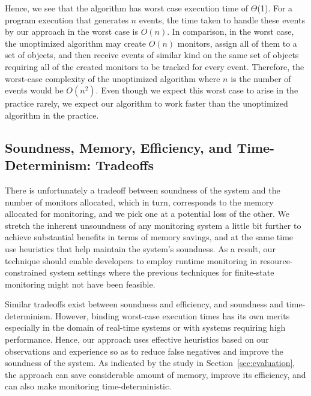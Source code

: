 Hence, we see that the algorithm has worst case execution time of
$\Theta$(1). For a program execution that  generates $n$ events, the time taken to handle 
these events by our approach in the worst case is $O(n)$. In comparison, in the worst case,
the unoptimized algorithm may create $O(n)$ monitors, assign all of them to a set of objects,
 and then receive events of similar kind on the same set of objects
 requiring all of the created monitors to be tracked for every event. Therefore, the worst-case complexity of the
 unoptimized algorithm where $n$ is the number of events would be $O(n^2)$. Even though we expect this worst case to arise 
 in the practice rarely, we expect our algorithm to work faster than the unoptimized algorithm in the practice.
 
\subsection{Soundness, Memory, Efficiency, and Time-Determinism: Tradeoffs}
\label{subsec:tradeoff}

There is unfortunately a tradeoff between soundness of the system and the
number of monitors allocated, which in turn, corresponds to the memory allocated
for monitoring, and we pick one at a potential loss of the other.
We stretch the inherent unsoundness of any monitoring system a little bit further to achieve substantial benefits in 
terms of memory savings, and at the same time use heuristics that help maintain
the system's soundness.  As a result, our technique should enable developers to employ runtime 
monitoring in resource-constrained system settings where the previous 
techniques for finite-state monitoring might not have been feasible.

Similar tradeoffs exist between soundness and efficiency, and soundness and time-determinism.
However, binding worst-case execution times has its own merits 
especially in the domain of real-time systems or with systems requiring high performance.
Hence, our approach uses effective heuristics based on our observations and experience so as to reduce false 
negatives and improve the soundness of the system. As indicated by the study
in Section~\ref{sec:evaluation}, the approach can save considerable amount of
memory, improve its efficiency, and can also make monitoring time-deterministic.

